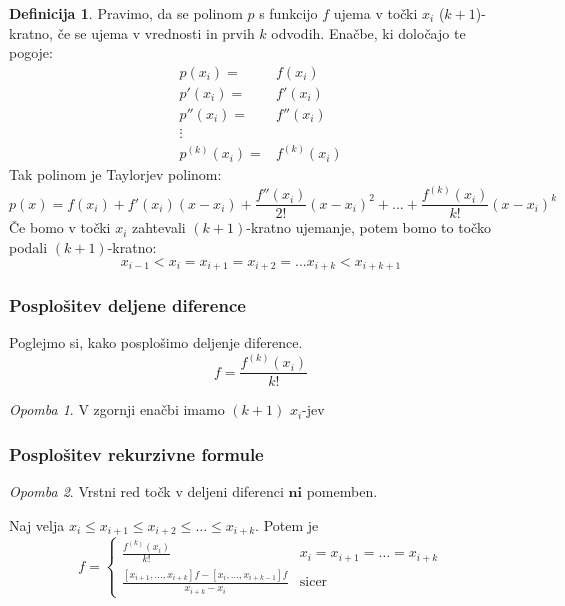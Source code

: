 \documentclass[a4paper,12pt]{article}
\theoremstyle{definition}
\newtheorem{defn}[counter]{Definicija}
\theoremstyle{remark}
\newtheorem*{rem}{Opomba}
\begin{document}
\begin{defn}
    Pravimo, da se polinom $p$ s funkcijo $f$ ujema v točki $x_i$ ($k+1$)-kratno, če se ujema v vrednosti in prvih $k$ odvodih.
    Enačbe, ki določajo te pogoje:
    \begin{align*}
        p(x_i) =& f(x_i) \\
        p'(x_i) =& f'(x_i) \\
        p''(x_i) =& f''(x_i) \\
        \vdots& \\
        p^{(k)}(x_i) =& f^{(k)}(x_i)
    \end{align*}
    Tak polinom je Taylorjev polinom:
    \begin{equation*}
        p(x) = f(x_i) + f'(x_i)(x-x_i) + \frac{f''(x_i)}{2!}(x-x_i)^2 + \dots + \frac{f^{(k)}(x_i)}{k!}(x-x_i)^k
    \end{equation*}
    Če bomo v točki $x_i$ zahtevali $(k+1)$-kratno ujemanje, potem bomo to točko podali $(k+1)$-kratno:
    \begin{equation*}
        x_{i-1} < x_i = x_{i+1} = x_{i+2} = \dots x_{i+k} < x_{i+k+1}
    \end{equation*}
\end{defn}

\subsubsection*{Posplošitev deljene diference}
Poglejmo si, kako posplošimo deljenje diference.
\begin{equation*}
    [x_i, x_i, \dots, x_i] f = \frac{f^{(k)}(x_i)}{k!}
\end{equation*}
\begin{rem}
    V zgornji enačbi imamo $(k+1)$ $x_i$-jev
\end{rem}

\subsubsection*{Posplošitev rekurzivne formule}
\begin{rem}
    Vrstni red točk v deljeni diferenci $\textbf{ni}$ pomemben.
\end{rem}
Naj velja $x_i \leq x_{i+1} \leq x_{i+2} \leq \dots \leq x_{i+k}$. Potem je
\begin{equation*}
    [x_i, x_{i+1}, \dots, x_{i+k}] f =
    \begin{cases}
        \frac{f^{(k)}(x_i)}{k!} & x_i = x_{i+1} = \dots = x_{i+k} \\
        \frac{[x_{i+1}, \dots, x_{i+k}] f - [x_{i}, \dots, x_{i+k-1}]f}{x_{i+k} - x_{i}} & \text{sicer}
    \end{cases}
\end{equation*}
\end{document}
